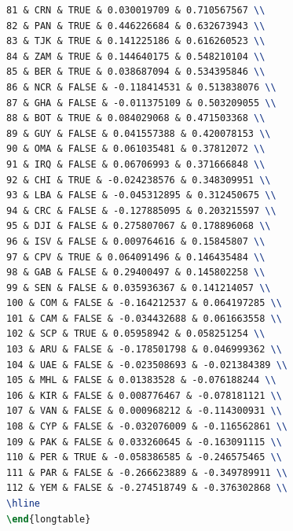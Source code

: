 \documentclass[12pt]{article}
\begin{document}
\begin{enumerate}
\begin{lstlisting}[language=Latex, style=mystyle]
81 & CRN & TRUE & 0.030019709 & 0.710567567 \\
82 & PAN & TRUE & 0.446226684 & 0.632673943 \\
83 & TJK & TRUE & 0.141225186 & 0.616260523 \\
84 & ZAM & TRUE & 0.144640175 & 0.548210104 \\
85 & BER & TRUE & 0.038687094 & 0.534395846 \\
86 & NCR & FALSE & -0.118414531 & 0.513838076 \\
87 & GHA & FALSE & -0.011375109 & 0.503209055 \\
88 & BOT & TRUE & 0.084029068 & 0.471503368 \\
89 & GUY & FALSE & 0.041557388 & 0.420078153 \\
90 & OMA & FALSE & 0.061035481 & 0.37812072 \\
91 & IRQ & FALSE & 0.06706993 & 0.371666848 \\
92 & CHI & TRUE & -0.024238576 & 0.348309951 \\
93 & LBA & FALSE & -0.045312895 & 0.312450675 \\
94 & CRC & FALSE & -0.127885095 & 0.203215597 \\
95 & DJI & FALSE & 0.275807067 & 0.178896068 \\
96 & ISV & FALSE & 0.009764616 & 0.15845807 \\
97 & CPV & TRUE & 0.064091496 & 0.146435484 \\
98 & GAB & FALSE & 0.29400497 & 0.145802258 \\
99 & SEN & FALSE & 0.035936367 & 0.141214057 \\
100 & COM & FALSE & -0.164212537 & 0.064197285 \\
101 & CAM & FALSE & -0.034432688 & 0.061663558 \\
102 & SCP & TRUE & 0.05958942 & 0.058251254 \\
103 & ARU & FALSE & -0.178501798 & 0.046999362 \\
104 & UAE & FALSE & -0.023508693 & -0.021384389 \\
105 & MHL & FALSE & 0.01383528 & -0.076188244 \\
106 & KIR & FALSE & 0.008776467 & -0.078181121 \\
107 & VAN & FALSE & 0.000968212 & -0.114300931 \\
108 & CYP & FALSE & -0.032076009 & -0.116562861 \\
109 & PAK & FALSE & 0.033260645 & -0.163091115 \\
110 & PER & TRUE & -0.058386585 & -0.246575465 \\
111 & PAR & FALSE & -0.266623889 & -0.349789911 \\
112 & YEM & FALSE & -0.274518749 & -0.376302868 \\
\hline
\end{longtable}
\end{lstlisting}

\end{enumerate}

\end{document}

